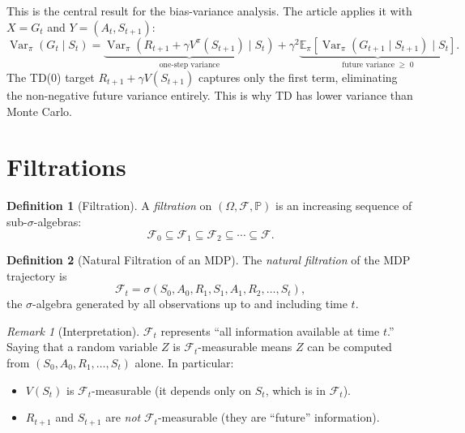 \documentclass[11pt,a4paper]{article}
\theoremstyle{definition}
\newtheorem{definition}{Definition}[section]
\theoremstyle{plain}
\theoremstyle{remark}
\newtheorem{remark}{Remark}[section]
\DeclareMathOperator{\Var}{Var}
\newcommand{\E}{\mathbb{E}}
\newcommand{\Prob}{\mathbb{P}}
\begin{document}
\begin{tdconnection}
This is the central result for the bias-variance analysis. The article applies it with $X = G_t$ and $Y = (A_t, S_{t+1})$:
\[
    \Var_\pi(G_t \mid S_t) = \underbrace{\Var_\pi(R_{t+1} + \gamma V^\pi(S_{t+1}) \mid S_t)}_{\text{one-step variance}} + \gamma^2 \underbrace{\E_\pi[\Var_\pi(G_{t+1} \mid S_{t+1}) \mid S_t]}_{\text{future variance} \;\geq\; 0}.
\]
The TD(0) target $R_{t+1} + \gamma V(S_{t+1})$ captures only the first term, eliminating the non-negative future variance entirely. This is why TD has lower variance than Monte Carlo.
\end{tdconnection}

\section{Filtrations}
\label{sec:filtrations}

\begin{definition}[Filtration]
\label{def:filtration}
A \emph{filtration} on $(\Omega, \mathcal{F}, \Prob)$ is an increasing sequence of sub-$\sigma$-algebras:
\begin{equation}
    \mathcal{F}_0 \subseteq \mathcal{F}_1 \subseteq \mathcal{F}_2 \subseteq \cdots \subseteq \mathcal{F}.
    \label{eq:filtration}
\end{equation}
\end{definition}

\begin{definition}[Natural Filtration of an MDP]
\label{def:mdp_filtration}
The \emph{natural filtration} of the MDP trajectory is
\begin{equation}
    \mathcal{F}_t = \sigma(S_0, A_0, R_1, S_1, A_1, R_2, \ldots, S_t),
    \label{eq:mdp_filtration}
\end{equation}
the $\sigma$-algebra generated by all observations up to and including time $t$.
\end{definition}

\begin{remark}[Interpretation]
$\mathcal{F}_t$ represents ``all information available at time $t$.'' Saying that a random variable $Z$ is $\mathcal{F}_t$-measurable means $Z$ can be computed from $(S_0, A_0, R_1, \ldots, S_t)$ alone. In particular:
\begin{itemize}[nosep]
    \item $V(S_t)$ is $\mathcal{F}_t$-measurable (it depends only on $S_t$, which is in $\mathcal{F}_t$).
    \item $R_{t+1}$ and $S_{t+1}$ are \emph{not} $\mathcal{F}_t$-measurable (they are ``future'' information).
\end{itemize}
\end{remark}
\end{document}
